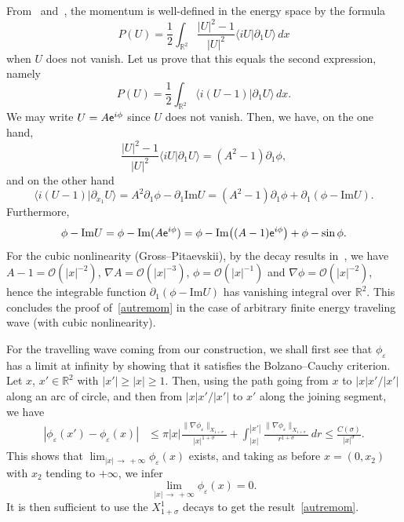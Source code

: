 \documentclass[10pt]{amsart}
\theoremstyle{definition}\newtheorem{defi}[theo]{Definition}\newtheorem{rema}[theo]{Remark}\newtheorem{exam}[theo]{Example}\newtheorem{exem}[theo]{Example}\newtheorem{nota}[theo]{Notation}
\newcommand*\p{\partial}
\newcommand*\R{\mathbb R}
\newcommand{\Imm}{\mathrm{Im}}
\newcommand*\BO{\mathcal{O}}
\newcommand*\ex{{\sf e}}
\newcommand*\ii{\infty}
\newcommand*\gs{\geqslant }
\newcommand*\ls{\leqslant }
\newcommand*\e{\varepsilon}
\newcommand*\s{\sigma}
\begin{document}
From~\cite[Definition~2.2 and (2.7)]{CM1} and~\cite{M_exist}, the momentum is well-defined in the energy space by the formula
\[
P (U) = \frac{1}{2} \int_{\R^2} \frac{ \lvert U \rvert^2 - 1 }{ \lvert U \rvert^2 } \langle i U | \p_1 U \rangle \, dx
\]
when $ U $ does not vanish. Let us prove that this equals the second expression, namely
\begin{equation}\label{autremom}
P (U) = \frac{1}{2} \int_{\R^2} \langle i (U - 1) | \p_{1} U \rangle \, dx.
\end{equation} We may write $ U = A \ex^{i \phi } $ since $U $ does not vanish. Then, we have, on the one hand,
\[
\frac{ \lvert U \rvert^2 - 1 }{ \lvert U \rvert^2 } \langle i U | \p_1 U \rangle = \left(A^2 - 1\right) \p_1 \phi,
\]
and on the other hand
\[
\langle i (U - 1) | \p_{x_1} U \rangle = A^2 \p_1 \phi - \p_1 {\Imm} U = \left(A^2 - 1\right) \p_1 \phi + \p_1 (\phi - {\Imm} U).
\]
Furthermore,
\[
\phi - {\Imm} U = \phi - {\Imm} (A \ex^{i \phi}) = \phi - {\Imm} \big((A-1) \ex^{i \phi} \big) + \phi - \sin \phi.
\]
For the cubic nonlinearity (Gross--Pitaevskii), by the decay results in~\cite[Theorem~11]{Gra_decay}, we have $ A-1 = \BO (|x|^{-2}) $, $ \nabla A = \BO (|x|^{-3}) $, $ \phi = \BO (|x|^{-1}) $ and $ \nabla \phi = \BO (|x|^{-2}) $, hence the integrable function $ \p_1 (\phi - {\Imm} U) $ has vanishing integral over $\R^2 $. This concludes the proof of~\eqref{autremom} in the case of arbitrary finite energy traveling wave (with cubic nonlinearity).

For the travelling wave coming from our construction, we shall first see that $ \phi_\e $ has a limit at infinity by showing that it satisfies the Bolzano--Cauchy criterion. Let $ x $, $x' \in \R^2 $ with $ |x'| \gs |x| \gs 1 $. Then, using the path going from $x$ to $ |x| x'/|x'| $ along an arc of circle, and then from $ |x| x'/|x'| $ to $x'$ along the joining segment, we have
\begin{align*}
\left\lvert \phi_\e (x') - \phi_\e (x) \right\rvert & \ls \pi |x| \frac{\| \nabla \phi_\e \|_{X_{1+\s}}}{ |x|^{1+\s} } + \int_{|x|}^{|x'|} \frac{ \| \nabla \phi_\e \|_{X_{1+\s} } }{ r^{1+\s} } \, dr
\ls \frac{C(\s)}{|x|^{\s} }.
\end{align*}
This shows that $ \lim_{|x|\,\to\,+\ii} \phi_\e (x) $ exists, and taking as before $ x = (0, x_2) $ with $ x_2 $ tending to $+\ii $, we infer
\[
\lim_{|x|\,\to\,+\ii } \phi_\e (x) = 0.
\]
It is then sufficient to use the $ X^1_{1+\s} $ decays to get the result~\eqref{autremom}.
\end{document}
